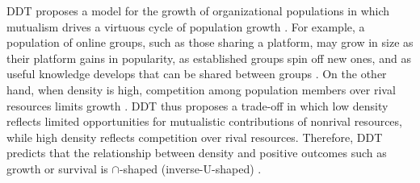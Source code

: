 \documentclass[letterpaper]{article}\usepackage[]{graphicx}\usepackage[]{color}
\begin{document}



DDT proposes a model for the growth of organizational populations in which mutualism drives a virtuous cycle of population growth \cite{carroll_density_1989,hannan_organizational_1989}.
For example, a population of online groups, such as those sharing a platform, may grow in size as their platform gains in popularity, as established groups spin off new ones, and as useful knowledge develops that can be shared between groups \cite{tan_tracing_2018, zhu_impact_2014}.
On the other hand, when density is high, competition among population members over rival resources limits growth \cite{hannan_organizational_1989}. 
DDT thus proposes a trade-off in which low density reflects limited opportunities for mutualistic contributions of nonrival resources,  while high density reflects competition over rival resources.  
Therefore, DDT predicts that the relationship between density and positive outcomes such as growth or survival is  $\cap$-shaped (inverse-U-shaped) \citep{baum_ecological_2006, carroll_density_1989}.



\end{document}
